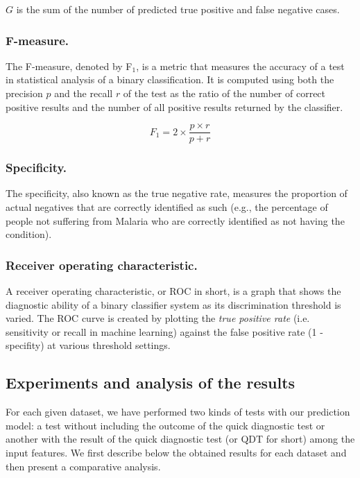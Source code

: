 $G$ is the sum of the number of predicted true positive and false negative cases.

\subsubsection{F-measure.} The F-measure, denoted by F$_1$, is a metric that measures the accuracy of a test in statistical analysis of a binary classification.
It is computed using both the precision $p$ and the recall $r$ of the test as the ratio of the number of correct positive results and the
number of all positive results returned by the classifier. 

\begin{equation}
F_1 = 2 \times \frac{p\times r}{p + r}
\label{f-measure}
\end{equation}
 
\subsubsection{Specificity.} The specificity, also known as the true negative rate, measures the proportion of actual negatives that are correctly identified as such 
(e.g., the percentage of people not suffering from Malaria  who are correctly identified as not having the condition).

\subsubsection{Receiver operating characteristic.} A receiver operating characteristic, or ROC in short, is a graph
 that shows the diagnostic ability of a binary classifier system as its discrimination threshold is varied.
The ROC curve is created by plotting the \emph{true positive rate} (i.e. sensitivity or recall in machine learning) 
against the false positive rate (1 - specifity) at various threshold settings. 

\subsection{Experiments and analysis of the results}
For each given dataset, we have performed two kinds of tests with our prediction model: a test without including the outcome of the quick diagnostic test
or another with the result of the quick diagnostic test (or QDT for short) among the input features. We first describe below the obtained results for each dataset and
then present a comparative analysis.

